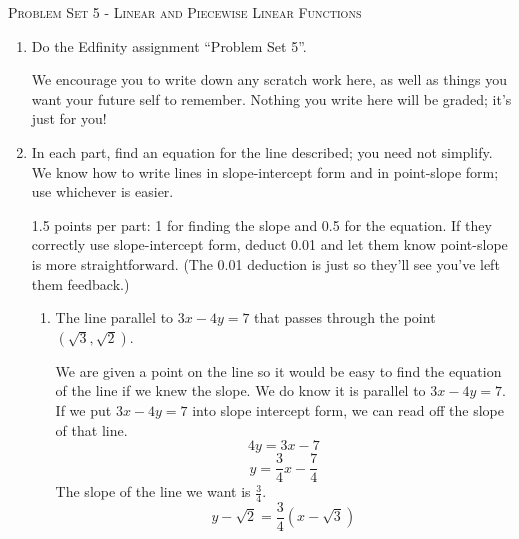 \documentclass{article}
\newcommand{\doedfinity}[2][\newpage]{
  \begin{problem}[#1]
    Do the Edfinity assignment ``Problem Set #2''.

    We encourage you to write down any scratch work here, as well as
    things you want your future self to remember. Nothing you write
    here will be graded; it's just for you!
  \end{problem}
}
\begin{document}
\begin{center}
  \large\textsc{Problem Set 5 - Linear and Piecewise Linear Functions}
\end{center}

\begin{enumerate}
\item 


  \doedfinity{5}

\item 

  In each part, find an equation for the line described; you need not simplify. We know how to write lines in slope-intercept form and in point-slope form; use whichever is easier. 

  \begin{grading}
    1.5 points per part: 1 for finding the slope and 0.5 for the equation. If they correctly use slope-intercept form, deduct 0.01 and let them know point-slope is more straightforward. (The 0.01 deduction is just so they'll see you've left them feedback.) 
  \end{grading}

  \begin{enumerate}

  \item
    \begin{problem}[\vfill]
      The line parallel to $3x-4y=7$ that passes through the point $(\sqrt{3}, \sqrt{2})$.
    \end{problem}

    \begin{solution} 
      We are given a point on the line so it would be easy to find the equation of the line if we knew the slope. We do know it is parallel to $3x-4y =7$. If we put  $3x-4y =7$ into slope intercept form, we can read off the slope of that line. $$4y = 3x-7$$ 
      $$ y = \frac{3}{4}x -\frac{7}{4}$$ 
      The slope of the line we want is $\frac{3}{4}$.
      $$ \boxed{y - \sqrt{2} = \frac{3}{4} (x- \sqrt{3})}$$
    \end{solution}


\end{enumerate}
\end{enumerate}
\end{document}
